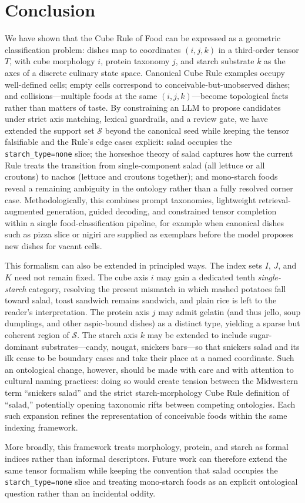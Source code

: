 \section{Conclusion}

We have shown that the Cube Rule of Food can be expressed as a geometric classification problem: dishes map to coordinates $(i,j,k)$ in a third-order tensor $T$, with cube morphology $i$, protein taxonomy $j$, and starch substrate $k$ as the axes of a discrete culinary state space.
Canonical Cube Rule examples occupy well-defined cells; empty cells correspond to conceivable-but-unobserved dishes; and collisions---multiple foods at the same $(i,j,k)$---become topological facts rather than matters of taste.
By constraining an LLM to propose candidates under strict axis matching, lexical guardrails, and a review gate, we have extended the support set $\mathcal{S}$ beyond the canonical seed while keeping the tensor falsifiable and the Rule's edge cases explicit: salad occupies the \texttt{starch\_type=none} slice; the horseshoe theory of salad captures how the current Rule treats the transition from single-component salad (all lettuce or all croutons) to nachos (lettuce and croutons together); and mono-starch foods reveal a remaining ambiguity in the ontology rather than a fully resolved corner case.
Methodologically, this combines prompt taxonomies, lightweight retrieval-augmented generation, guided decoding, and constrained tensor completion within a single food-classification pipeline, for example when canonical dishes such as pizza slice or nigiri are supplied as exemplars before the model proposes new dishes for vacant cells.

This formalism can also be extended in principled ways.
The index sets $I$, $J$, and $K$ need not remain fixed.
The cube axis $i$ may gain a dedicated tenth \emph{single-starch} category, resolving the present mismatch in which mashed potatoes fall toward salad, toast sandwich remains sandwich, and plain rice is left to the reader's interpretation.
The protein axis $j$ may admit gelatin (and thus jello, soup dumplings, and other aspic-bound dishes) as a distinct type, yielding a sparse but coherent region of $\mathcal{S}$.
The starch axis $k$ may be extended to include sugar-dominant substrates---candy, nougat, snickers bars---so that snickers salad and its ilk cease to be boundary cases and take their place at a named coordinate.
Such an ontological change, however, should be made with care and with attention to cultural naming practices: doing so would create tension between the Midwestern term ``snickers salad'' and the strict starch-morphology Cube Rule definition of ``salad,'' potentially opening taxonomic rifts between competing ontologies.
Each such expansion refines the representation of conceivable foods within the same indexing framework.

More broadly, this framework treats morphology, protein, and starch as formal indices rather than informal descriptors.
Future work can therefore extend the same tensor formalism while keeping the convention that salad occupies the \texttt{starch\_type=none} slice and treating mono-starch foods as an explicit ontological question rather than an incidental oddity.
